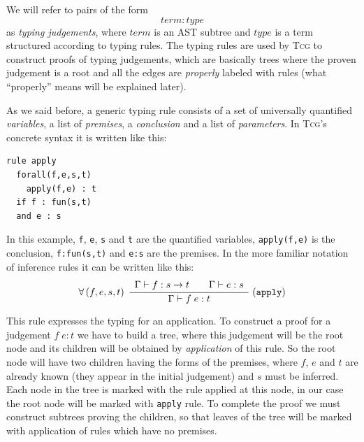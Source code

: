 \documentclass[screen]{beamer}
\newcommand{\Tcg}{\textsc{Tcg}}
\newcommand{\code}[1]{\texttt{#1}}
\newcounter{premise}
\newcommand{\ifnotempty}[2]{\ifthenelse{\equal{#1}{}}{}{#2}}
\newcommand{\tcgrule}[5]{%
	\setcounter{premise}{0}%
$$%
    \ifnotempty{#1}{%
        \forall \left(#1\right)\;%
    }%
    \dfrac{%
	    \begin{array}[b]{l}%
	    #2%
            \end{array}%
    }{%
            #3%
    }%
    \;\ifnotempty{#4}{(\mathtt{#4}\ifnotempty{#5}{[\mathbf{#5}]})}%
$$%
}
\begin{document}
We will refer to pairs of the form
$$term : type$$
as \emph{typing judgements}, where $term$ is an AST subtree and $type$ is a term structured according to typing rules. The typing rules are used by \Tcg{} to construct proofs of typing judgements, which are basically trees where the proven judgement is a root and all the edges are \emph{properly} labeled with rules (what ``properly'' means will be explained later). 

As we said before, a generic typing rule consists of a set of universally quantified \emph{variables}, a list of \emph{premises}, a \emph{conclusion} and a list of \emph{parameters}. In \Tcg{}'s concrete syntax it is written like this:
\begin{verbatim}
rule apply
  forall(f,e,s,t)
    apply(f,e) : t
  if f : fun(s,t)
  and e : s
\end{verbatim}

In this example, \code{f}, \code{e}, \code{s} and \code{t} are the quantified variables, \code{apply(f,e)} is the conclusion, \code{f:fun(s,t)} and \code{e:s} are the premises. In the more familiar notation of inference rules it can be written like this:
\tcgrule{f, e, s, t}{
    \Gamma \vdash f : s \rightarrow t
    \hspace{20pt}
    \Gamma \vdash e : s
}{\Gamma \vdash f\; e : t}{apply}{}

This rule expresses the typing for an application. To construct a proof for a judgement $f\;e : t$ we have to build a tree, where this judgement will be the root node and its children will be obtained by \emph{application} of this rule. So the root node will have two children having the forms of the premises, where $f$, $e$ and $t$ are already known (they appear in the initial judgement) and $s$ must be inferred. Each node in the tree is marked with the rule applied at this node, in our case the root node will be marked with \code{apply} rule. To complete the proof we must construct subtrees proving the children, so that leaves of the tree will be marked with application of rules which have no premises. 
\end{document}
